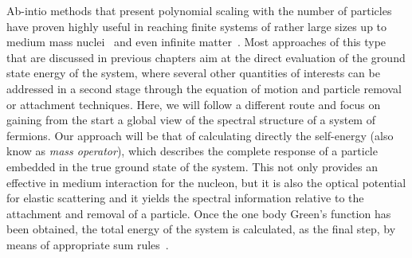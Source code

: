 Ab-intio methods that present polynomial scaling with the number of particles have proven highly useful in reaching
finite systems of rather large sizes up to medium mass nuclei~\cite{ch11_Soma2014s2n,ch11_Binder2014ccSn132,ch11_Hergert2014Ni} and even infinite matter~\cite{ch11_Frick2003,ch11_Baardsen2013ccNM,ch11_Carbone2014}. Most approaches of this type that are discussed in previous chapters aim at the direct evaluation of the ground state energy of the system, where several other quantities of interests can be addressed in a second stage through the equation of motion and particle removal or attachment techniques.
%
Here, we will follow a different route and focus on gaining from the start a global  view of the spectral structure of a system of fermions. Our approach will be that of calculating directly the self-energy (also know as {\em mass operator}), which describes the 
complete response of a particle embedded in the true ground state of the system. This not only provides an effective in medium interaction for the nucleon, but it is also the optical potential for elastic scattering and it yields the spectral information relative to the attachment and removal of a particle.   Once the  one body Green's function has been obtained, the total energy of the system is calculated, as the final step, by means of appropriate sum rules~\cite{ch11_dickhoff2004}.

